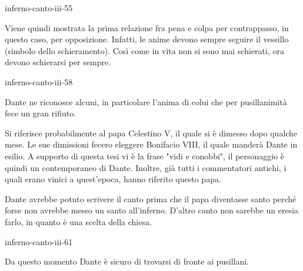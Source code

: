 \documentclass[preview]{standalone}
\begin{document}
\begin{snippet}{inferno-canto-iii-55}
    
    Viene quindi mostrata la prima relazione fra pena e colpa per contrappasso,
    in questo caso, per opposizione. Infatti, le anime devono sempre seguire il vessillo (simbolo dello schieramento).
    Così come in vita non si sono mai schierati, ora devono schierarsi per sempre.
\end{snippet}

\begin{snippet}{inferno-canto-iii-58}
    
    Dante ne riconosce alcuni, in particolare l'anima di colui
    che per pusillanimità fece un gran rifiuto.

    Si riferisce probabilmente al papa Celestino V, il quale si è dimesso
    dopo qualche mese. Le sue dimissioni fecero eleggere Bonifacio VIII, il quale manderà Dante in esilio.
    A supporto di questa tesi vi è la frase "vidi e conobbi", il personaggio è quindi un contemporaneo
    di Dante. Inoltre, già tutti i commentatori antichi, i quali erano vinici a quest'epoca,
    hanno riferito questo papa.

    Dante avrebbe potuto scrivere il canto prima che il papa diventasse santo
    perché forse non avrebbe messo un santo all'inferno.
    D'altro canto non sarebbe un eresia farlo, in quanto è una scelta della chiesa.
\end{snippet}

\begin{snippet}{inferno-canto-iii-61}

    Da questo momento Dante è sicuro di trovarsi di fronte ai pusillani.
\end{snippet}
\end{document}
